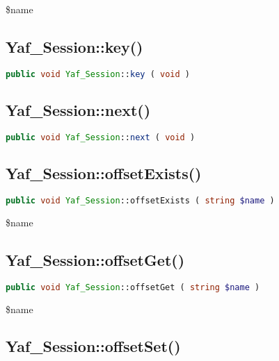 \begin{compactitem}
\item \$name
\end{compactitem}

\subsection{Yaf\_Session::key()}


\begin{lstlisting}[language=PHP]
public void Yaf_Session::key ( void )
\end{lstlisting}


\subsection{Yaf\_Session::next()}


\begin{lstlisting}[language=PHP]
public void Yaf_Session::next ( void )
\end{lstlisting}



\subsection{Yaf\_Session::offsetExists()}




\begin{lstlisting}[language=PHP]
public void Yaf_Session::offsetExists ( string $name )
\end{lstlisting}

\begin{compactitem}
\item \$name
\end{compactitem}

\subsection{Yaf\_Session::offsetGet()}


\begin{lstlisting}[language=PHP]
public void Yaf_Session::offsetGet ( string $name )
\end{lstlisting}


\begin{compactitem}
\item \$name
\end{compactitem}

\subsection{Yaf\_Session::offsetSet()}


